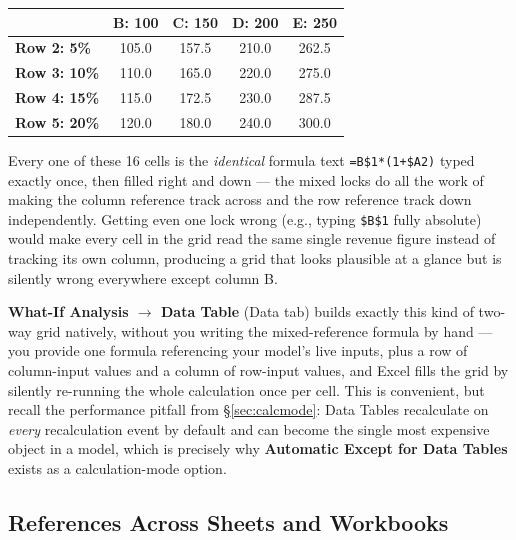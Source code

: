 \documentclass[11pt,a4paper]{article}
\begin{document}
\begin{center}
\begin{tabular}{@{}lcccc@{}}
\toprule
 & \textbf{B: 100} & \textbf{C: 150} & \textbf{D: 200} & \textbf{E: 250} \\
\midrule
\textbf{Row 2: 5\%}  & 105.0 & 157.5 & 210.0 & 262.5 \\
\textbf{Row 3: 10\%} & 110.0 & 165.0 & 220.0 & 275.0 \\
\textbf{Row 4: 15\%} & 115.0 & 172.5 & 230.0 & 287.5 \\
\textbf{Row 5: 20\%} & 120.0 & 180.0 & 240.0 & 300.0 \\
\bottomrule
\end{tabular}
\end{center}

\begin{keyconcept}
Every one of these 16 cells is the \emph{identical} formula text \texttt{=B\$1*(1+\$A2)} typed exactly once, then filled right and down --- the mixed locks do all the work of making the column reference track across and the row reference track down independently. Getting even one lock wrong (e.g., typing \texttt{\$B\$1} fully absolute) would make every cell in the grid read the same single revenue figure instead of tracking its own column, producing a grid that looks plausible at a glance but is silently wrong everywhere except column B.
\end{keyconcept}

\begin{protip}
\textbf{What-If Analysis $\rightarrow$ Data Table} (Data tab) builds exactly this kind of two-way grid natively, without you writing the mixed-reference formula by hand --- you provide one formula referencing your model's live inputs, plus a row of column-input values and a column of row-input values, and Excel fills the grid by silently re-running the whole calculation once per cell. This is convenient, but recall the performance pitfall from \S\ref{sec:calcmode}: Data Tables recalculate on \emph{every} recalculation event by default and can become the single most expensive object in a model, which is precisely why \textbf{Automatic Except for Data Tables} exists as a calculation-mode option.
\end{protip}

\subsection{References Across Sheets and Workbooks}
\end{document}
